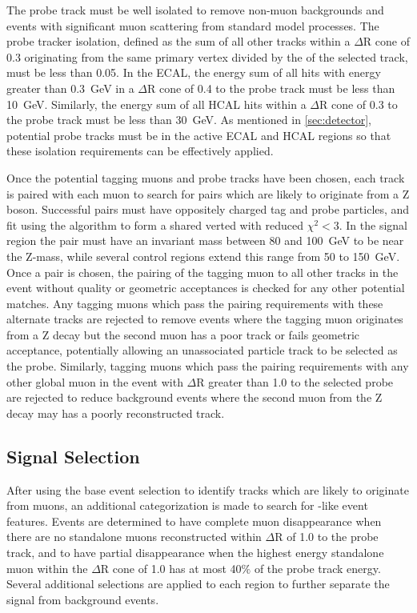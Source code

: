 The probe track must be well isolated to remove non-muon backgrounds and events with significant muon scattering from standard model processes. 
The probe tracker isolation, defined as the \pt sum of all other tracks within a $\Delta$R cone of 0.3 originating from the same primary vertex divided by the \pt of the selected track, must be less than 0.05.
In the ECAL, the energy sum of all hits with energy greater than \SI{0.3}{\giga\eV} in a $\Delta$R cone of 0.4 to the probe track must be less than \SI{10}{\giga\eV}.
Similarly, the energy sum of all HCAL hits within a $\Delta$R cone of 0.3 to the probe track must be less than \SI{30}{\giga\eV}. 
As mentioned in \cref{sec:detector}, potential probe tracks must be in the active ECAL and HCAL regions so that these isolation requirements can be effectively applied.

Once the potential tagging muons and probe tracks have been chosen, each track is paired with each muon to search for pairs which are likely to originate from a Z boson.
Successful pairs must have oppositely charged tag and probe particles, and fit using the \kf algorithm to form a shared verted with reduced $\chi^2<$3.
In the signal region the pair must have an invariant mass between 80 and \SI{100}{\giga\eV} to be near the Z-mass, while several control regions extend this range from 50 to \SI{150}{\giga\eV}.
Once a pair is chosen, the pairing of the tagging muon to all other tracks in the event without quality or geometric acceptances is checked for any other potential matches.
Any tagging muons which pass the pairing requirements with these alternate tracks are rejected to remove events where the tagging muon originates from a Z decay but the second muon has a poor track or fails geometric acceptance, potentially allowing an unassociated particle track to be selected as the probe.
Similarly, tagging muons which pass the pairing requirements with any other global muon in the event with $\Delta$R greater than 1.0 to the selected probe are rejected to reduce background events where the second muon from the Z decay may has a poorly reconstructed track.


\subsection{Signal Selection}
After using the base event selection to identify tracks which are likely to originate from muons, an additional categorization is made to search for \dbrem-like event features. 
Events are determined to have complete muon disappearance when there are no standalone muons reconstructed within $\Delta$R of 1.0 to the probe track, and to have partial disappearance when the highest energy standalone muon within the $\Delta$R cone of 1.0 has at most 40$\%$ of the probe track energy.
Several additional selections are applied to each region to further separate the signal from background events.


